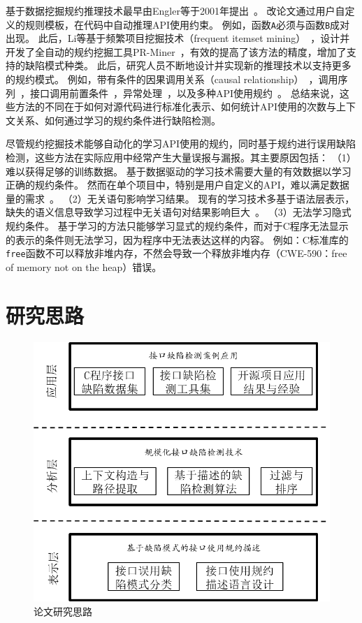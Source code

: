 基于数据挖掘规约推理技术最早由Engler等于2001年提出~\cite{01-sosp-mining}。
改论文通过用户自定义的规则模板，在代码中自动推理API使用约束。
例如，函数\texttt{A}必须与函数\texttt{B}成对出现。
此后，Li等基于频繁项目挖掘技术（frequent itemset mining）~\cite{03-fimi-frequent}，设计并开发了全自动的规约挖掘工具PR-Miner~\cite{05-fse-prminer}，有效的提高了该方法的精度，增加了支持的缺陷模式种类。
此后，研究人员不断地设计并实现新的推理技术以支持更多的规约模式。
例如，带有条件的因果调用关系（causal relationship）~\cite{07-fse-temporal}，调用序列~\cite{09-ase-sequence}，接口调用前置条件~\cite{14-fse-pre}，异常处理~\cite{16-ase-apex}，以及多种API使用规约~\cite{16-sec-apisan}。
总结来说，这些方法的不同在于如何对源代码进行标准化表示、如何统计API使用的次数与上下文关系、如何通过学习的规约条件进行缺陷检测。

尽管规约挖掘技术能够自动化的学习API使用的规约，同时基于规约进行误用缺陷检测，这些方法在实际应用中经常产生大量误报与漏报。其主要原因包括：
（1）难以获得足够的训练数据。
基于数据驱动的学习技术需要大量的有效数据以学习正确的规约条件。
然而在单个项目中，特别是用户自定义的API，难以满足数据量的需求~\cite{15-kernel-sv,survey18}。
（2）无关语句影响学习结果。
现有的学习技术多基于语法层表示，缺失的语义信息导致学习过程中无关语句对结果影响巨大~\cite{16-icse-antminer}。
（3）无法学习隐式规约条件。
基于学习的方法只能够学习显式的规约条件，而对于C程序无法显示的表示的条件则无法学习，因为程序中无法表达这样的内容。
例如：C标准库的\texttt{free}函数不可以释放非堆内存，不然会导致一个释放非堆内存（CWE-590：free of memory not on the heap）错误。


\section{研究思路}

\begin{figure}[b]
	\centering
	\includegraphics[width=0.85\linewidth]{figures/cp1-overview.png}
	\caption{
		论文研究思路
	}
	\label{fig:1-3-overview}
\end{figure}

